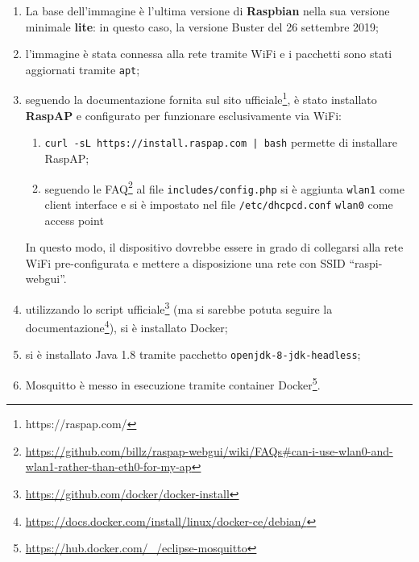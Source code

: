  \begin{enumerate}
    \item
      La base dell'immagine è l'ultima versione di \textbf{Raspbian} nella sua versione minimale \textbf{lite}:
      in questo caso, la versione Buster del 26 settembre 2019;
    \item
      l'immagine è stata connessa alla rete tramite WiFi e i pacchetti sono stati aggiornati tramite \texttt{apt};
    \item
      seguendo la documentazione fornita sul sito ufficiale\footnote{https://raspap.com/}, è stato installato \textbf{RaspAP} e configurato per funzionare esclusivamente via WiFi:
      \begin{enumerate}
        \item
          \texttt{curl -sL https://install.raspap.com | bash} permette di installare RaspAP;
        \item
          seguendo le FAQ\footnote{\url{https://github.com/billz/raspap-webgui/wiki/FAQs#can-i-use-wlan0-and-wlan1-rather-than-eth0-for-my-ap}}
          al file \texttt{includes/config.php} si è aggiunta \texttt{wlan1} come client interface e si è impostato nel file \texttt{/etc/dhcpcd.conf}
          \texttt{wlan0} come access point
      \end{enumerate}
      In questo modo, il dispositivo dovrebbe essere in grado di collegarsi alla rete WiFi pre-configurata e mettere a disposizione una rete con SSID ``raspi-webgui''.
    \item
      utilizzando lo script ufficiale\footnote{\url{https://github.com/docker/docker-install}}
      (ma si sarebbe potuta seguire la documentazione\footnote{\url{https://docs.docker.com/install/linux/docker-ce/debian/}}), si è installato Docker;
    \item
      si è installato Java 1.8 tramite pacchetto \texttt{openjdk-8-jdk-headless};
    \item Mosquitto è messo in esecuzione tramite container Docker\footnote{\url{https://hub.docker.com/_/eclipse-mosquitto}}.
  \end{enumerate}

